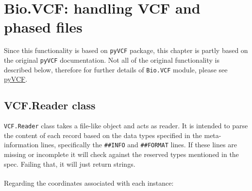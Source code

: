 \chapter{Bio.VCF: handling VCF and phased files}

Since this functionality is based on \verb|pyVCF|
package, this chapter is partly based on the original \verb|pyVCF| documentation. Not all of the original functionality
is described below, therefore for further details of \verb|Bio.VCF| module, please see
\href{http://pyvcf.readthedocs.io/en/latest/INTRO.html}{pyVCF}.

\section{VCF.Reader class}

\verb|VCF.Reader| class takes a file-like object and acts as reader. It is intended to parse the content of each record
based on the data types specified in the meta-information lines, specifically the \verb|##INFO| and \verb|##FORMAT| lines.
If these lines are missing or incomplete it will check against the reserved types mentioned in the spec.
Failing that, it will just return strings.
\\
\\

\noindent Regarding the coordinates associated with each instance:

